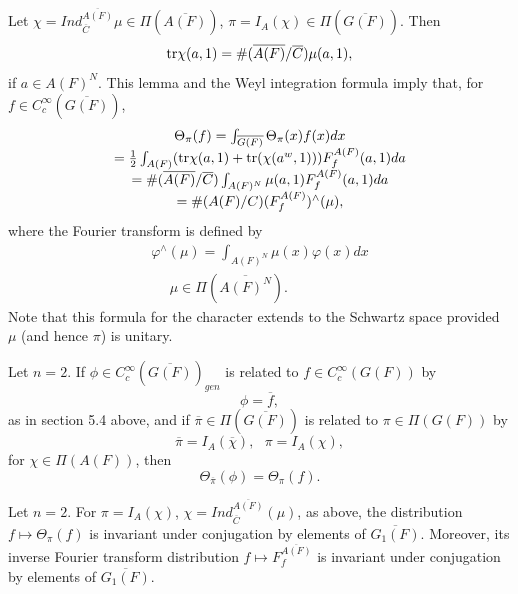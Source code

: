 Let $\chi =Ind_{\overline{C}}^{\overline{A(F)}}\mu \in
\Pi (\overline{A(F)})$,
$\pi =I_{A}(\chi )\in \Pi (\overline{G(F)})$. Then
\begin{equation}
{\rm tr}\chi (a,1)=
\#( \overline{A(F)}/\overline{C})\mu (a,1),
\end{equation}
if $a\in A(F)^N$. This lemma and the Weyl integration formula
imply that, for $f\in C_c^\infty
(\overline{G(F)})$,
\begin{equation}
\begin{array}{c}
\Theta _\pi (f)=\int_{\overline{G(F)}}\Theta _\pi (x)f(x)dx \\
=\frac 12\int_{A(F)}({\rm tr}\chi (a,1)+{\rm tr}(\chi
(a^w,1)))F_f^{A(F)}(a,1)da \\
=\#( \overline{A(F)}/\overline{C})
\int_{A(F)^N}\mu (a,1)F_f^{A(F)}(a,1)da \\
=\#(A(F)/C)
(F_f^{A(F)})^{\wedge }(\mu ) ,
\end{array}
\end{equation}
where the Fourier transform is defined by
\begin{equation}
\begin{array}{c}
\varphi ^{\wedge }(\mu )=\int_{A(F)^N}\mu (x)\varphi
(x)dx \\
\ \ \ \ \ \ \mu \in \Pi (\overline{A(F)^N}).
\end{array}
\end{equation}
Note that this formula for the character extends to the
Schwartz space provided $\mu $ (and hence $\pi $) is unitary.

\begin{corollary}
Let $n=2$. If $\phi\in C^\infty_c(\overline{G(F)})_{gen}$
is related to $f\in C_c^\infty(G(F))$ by
\[
\phi=\overline{f},
\]
as in section 5.4 above, and if
$\overline{\pi}\in \Pi(\overline{G(F)})$ is related to
$\pi\in\Pi(G(F))$ by
\[
\overline{\pi}
=I_A(\overline{\chi}),\ \ \
\pi=I_A(\chi),
\]
for $\chi\in\Pi(A(F))$, then
\[
\Theta_{\overline{\pi}}(\phi)=\Theta_{\pi}(f).
\]
\end{corollary}

\begin{lemma} Let $n=2$. For $\pi=I_A(\chi)$,
$\chi=Ind_{\overline{C}}^{\overline{A(F)}}(\mu)$, as above,
the distribution $f\longmapsto \Theta_\pi(f)$ is
invariant under conjugation by elements of
$\overline{G_1(F)}$.
Moreover, its inverse Fourier transform
distribution $f\longmapsto F_f^{\overline{A(F)}}$ is
invariant under conjugation by elements of
$\overline{G_1(F)}$.
\end{lemma}

